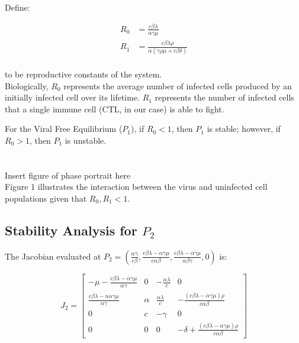 \documentclass{article}
\begin{document}
Define:

\begin{equation}
	\begin{split}
		R_{0} &= \frac{c \beta \lambda}{\alpha \gamma \mu} \\
		R_{1} &= \frac{c \beta \lambda \rho}{\alpha (\gamma \rho \mu + c \beta \delta)}
	\end{split}
\end{equation}\\

to be reproductive constants of the system.\\
Biologically, $R_{0}$ represents the average number of infected cells produced by an initially infected cell over its lifetime. $R_{1}$ represents the number of infected cells that a single immune cell (CTL, in our case) is able to fight.

For the Viral Free Equilibrium ($P_{1}$), if $R_{0} < 1$, then $P_{1}$ is stable; however, if $R_{0} > 1$, then $P_{1}$ is unstable.\\
\\
\\Insert figure of phase portrait here
\\ Figure 1 illustrates the interaction between the virus and uninfected cell populations given that $R_{0}, R_{1} < 1$.

\subsection{Stability Analysis for $P_{2}$}

The Jacobian evaluated at $P_{2} = (\frac{\alpha \gamma}{c \beta}, \frac{c  \beta \lambda - \alpha \gamma \mu}{c \alpha \beta}, \frac{c \beta \lambda - \alpha \gamma \mu}{\alpha \beta \gamma}, 0)$ is:

\[J_{2} =
	\begin{bmatrix}
		- \mu - \frac{c \beta \lambda - \alpha \gamma \mu}{\alpha \gamma} & 0 & - \frac{\alpha \lambda}{c} & 0 \\
		\frac{c \beta \lambda - n\alpha \gamma \mu}{\alpha \gamma} & \alpha & \frac{\alpha \lambda}{c} & - \frac{(c \beta \lambda - \alpha \gamma \mu) \rho}{c \alpha \beta} \\
		0 & c & - \gamma & 0 \\
		0 & 0 & 0 & - \delta + \frac{(c \beta \lambda - \alpha \gamma \mu) \rho}{c \alpha \beta}
	\end{bmatrix}
\]\\
\end{document}
